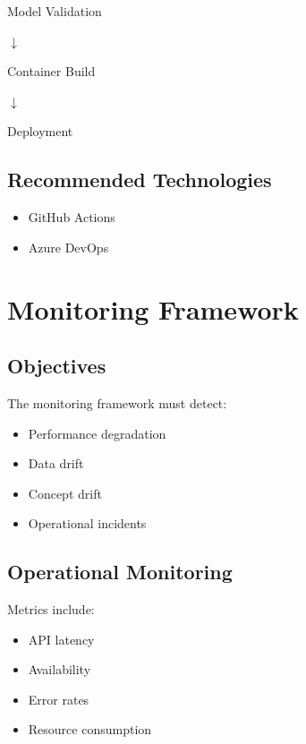 \begin{center}
Model Validation
\end{center}

\begin{center}
$\downarrow$
\end{center}

\begin{center}
Container Build
\end{center}

\begin{center}
$\downarrow$
\end{center}

\begin{center}
Deployment
\end{center}

\subsection{Recommended Technologies}

\begin{itemize}
    \item GitHub Actions
    \item Azure DevOps
\end{itemize}

\section{Monitoring Framework}

\subsection{Objectives}

The monitoring framework must detect:

\begin{itemize}
    \item Performance degradation
    \item Data drift
    \item Concept drift
    \item Operational incidents
\end{itemize}

\subsection{Operational Monitoring}

Metrics include:

\begin{itemize}
    \item API latency
    \item Availability
    \item Error rates
    \item Resource consumption
\end{itemize}

